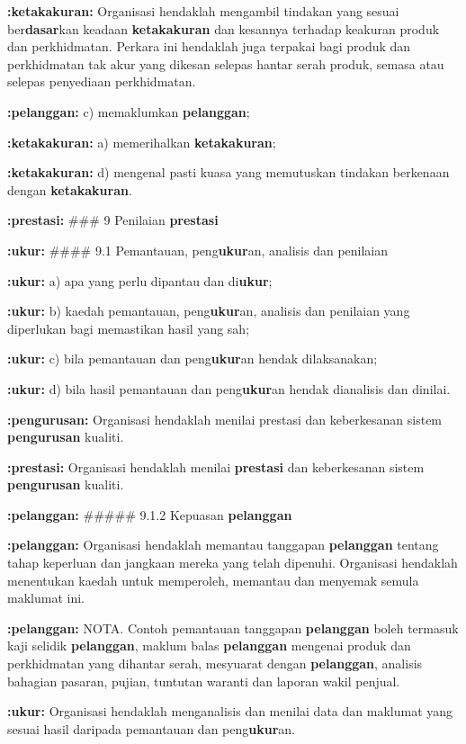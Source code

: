 \documentclass{article}
\begin{document}
\textbf{:ketakakuran:} Organisasi hendaklah mengambil tindakan yang sesuai ber\textbf{dasar}kan keadaan \textbf{ketakakuran}
dan kesannya terhadap keakuran produk dan perkhidmatan. Perkara ini hendaklah juga
terpakai bagi produk dan perkhidmatan tak akur yang dikesan selepas hantar serah produk,
semasa atau selepas penyediaan perkhidmatan.

\textbf{:pelanggan:} c) memaklumkan \textbf{pelanggan};

\textbf{:ketakakuran:} a) memerihalkan \textbf{ketakakuran};

\textbf{:ketakakuran:} d) mengenal pasti kuasa yang memutuskan tindakan berkenaan dengan \textbf{ketakakuran}.

\textbf{:prestasi:} \#\#\# 9 Penilaian \textbf{prestasi}

\textbf{:ukur:} \#\#\#\# 9.1 Pemantauan, peng\textbf{ukur}an, analisis dan penilaian

\textbf{:ukur:} a) apa yang perlu dipantau dan di\textbf{ukur};

\textbf{:ukur:} b) kaedah pemantauan, peng\textbf{ukur}an, analisis dan penilaian yang diperlukan bagi
memastikan hasil yang sah;

\textbf{:ukur:} c) bila pemantauan dan peng\textbf{ukur}an hendak dilaksanakan;

\textbf{:ukur:} d) bila hasil pemantauan dan peng\textbf{ukur}an hendak dianalisis dan dinilai.

\textbf{:pengurusan:} Organisasi hendaklah menilai prestasi dan keberkesanan sistem \textbf{pengurusan} kualiti.

\textbf{:prestasi:} Organisasi hendaklah menilai \textbf{prestasi} dan keberkesanan sistem \textbf{pengurusan} kualiti.

\textbf{:pelanggan:} \#\#\#\#\# 9.1.2 Kepuasan \textbf{pelanggan}

\textbf{:pelanggan:} Organisasi hendaklah memantau tanggapan \textbf{pelanggan} tentang tahap keperluan dan
jangkaan mereka yang telah dipenuhi. Organisasi hendaklah menentukan kaedah untuk
memperoleh, memantau dan menyemak semula maklumat ini.

\textbf{:pelanggan:} NOTA. Contoh pemantauan tanggapan \textbf{pelanggan} boleh termasuk kaji selidik \textbf{pelanggan}, maklum
balas \textbf{pelanggan} mengenai produk dan perkhidmatan yang dihantar serah, mesyuarat dengan
\textbf{pelanggan}, analisis bahagian pasaran, pujian, tuntutan waranti dan laporan wakil penjual.

\textbf{:ukur:} Organisasi hendaklah menganalisis dan menilai data dan maklumat yang sesuai hasil
daripada pemantauan dan peng\textbf{ukur}an.
\end{document}
